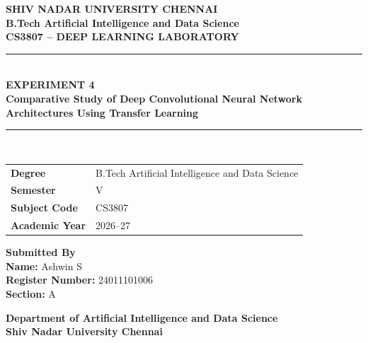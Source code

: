 \documentclass[12pt,a4paper]{article}
\begin{document}

\begin{titlepage}

\begin{center}

\vspace*{1cm}

{\Large \textbf{SHIV NADAR UNIVERSITY CHENNAI}}\\[0.4cm]

{\large \textbf{B.Tech Artificial Intelligence and Data Science}}\\[1.2cm]

{\Large \textbf{CS3807 -- DEEP LEARNING LABORATORY}}\\[1.2cm]

\rule{\textwidth}{1pt}\\[0.4cm]

{\LARGE \textbf{EXPERIMENT 4}}\\[0.4cm]

{\Large
\textbf{Comparative Study of Deep Convolutional Neural Network}\\
\textbf{Architectures Using Transfer Learning}
}\\[0.4cm]

\rule{\textwidth}{1pt}\\[2cm]

\begin{tabular}{ll}
\textbf{Degree} & B.Tech Artificial Intelligence and Data Science \\[0.3cm]
\textbf{Semester} & V \\[0.3cm]
\textbf{Subject Code} & CS3807 \\[0.3cm]
\textbf{Academic Year} & 2026--27 \\
\end{tabular}

\vfill

\textbf{Submitted By}\\[0.3cm]

\textbf{Name:} Ashwin S\\
\textbf{Register Number:} 24011101006\\
\textbf{Section:} A

\vfill

\textbf{Department of Artificial Intelligence and Data Science}\\
\textbf{Shiv Nadar University Chennai}

\end{center}

\end{titlepage}
\end{document}
